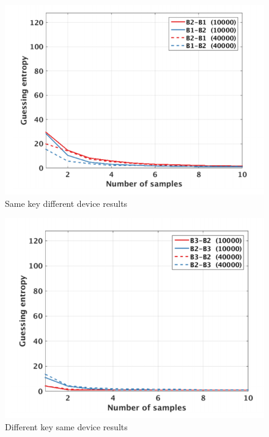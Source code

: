 \begin{figure}
    \centering
    \includegraphics[scale=0.5]{images/chapter8/same_key_different_device.PNG}
    \caption{Same key different device results}
    \label{fig:same_key_differnet_device}
\end{figure}

\begin{figure}
    \centering
    \includegraphics[scale=0.5]{images/chapter8/different_key_same_device.PNG}
    \caption{Different key same device results}
    \label{fig:different_key_same_device}
\end{figure}

